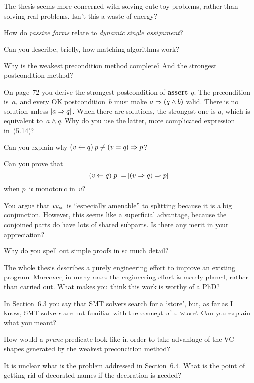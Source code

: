 \Q The thesis seems more concerned with solving cute toy problems, rather
than solving real problems. Isn't this a waste of energy?

\Q How do {\it passive forms\/} relate to {\it dynamic single assignment\/}?

\Q Can you describe, briefly, how matching algorithms work?

\Q Why is the weakest precondition method complete? And the strongest
postcondition method?

\Q On page~72 you derive the strongest postcondition of {\bf assert}~$q$.
The precondition is~$a$, and every OK postcondition~$b$ must make $a\Rightarrow
(q\land b)$ valid. There is no solution unless $|a\Rightarrow q|$.  When there
are solutions, the strongest one is $a$, which is equivalent to~$a\land q$.
Why do you use the latter, more complicated expression in~(5.14)?


\Q Can you explain why $(v\gets q)\;p\not\equiv(v=q)\Rightarrow p$?

\Q Can you prove that $$|(v\gets q)\;p|=|(v\Rightarrow q)\Rightarrow p|$$ when $p$~is
monotonic in~$v$?

\Q You argue that ${\it vc}_{\rm sp}$ is ``especially amenable'' to
splitting because it is a big conjunction. However, this seems like a
superficial advantage, because the conjoined parts do have lots of shared
subparts.  Is there any merit in your appreciation?

\Q Why do you spell out simple proofs in so much detail?

\Q The whole thesis describes a purely engineering effort to improve an
existing program. Moreover, in many cases the engineering effort is merely
planed, rather than carried out. What makes you think this work is worthy
of a PhD?

\Q In Section~6.3 you say that SMT solvers search for a `store', but, as
far as I know, SMT solvers are not familiar with the concept of a `store'.
Can you explain what you meant?

\Q How would a {\it prune\/} predicate look like in order to take advantage
of the VC shapes generated by the weakest precondition method?

\Q It is unclear what is the problem addressed in Section~6.4. What is the
point of getting rid of decorated names if the decoration is needed?


